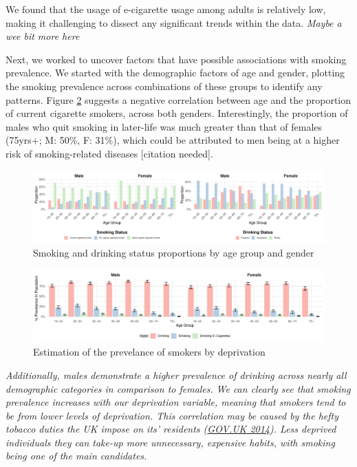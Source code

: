 \documentclass[
  11pt,
  twocolumn]{article}
\begin{document}
We found that the usage of e-cigarette usage among adults is relatively
low, making it challenging to dissect any significant trends within the
data. \emph{Maybe a wee bit more here}

Next, we worked to uncover factors that have possible associations with
smoking prevalence. We started with the demographic factors of age and
gender, plotting the smoking prevalence across combinations of these
groups to identify any patterns. Figure \ref{fig:output-prevelance-plot}
suggests a negative correlation between age and the proportion of
current cigarette smokers, across both genders. Interestingly, the
proportion of males who quit smoking in later-life was much greater than
that of females (75yrs+; M: 50\%, F: 31\%), which could be attributed to
men being at a higher risk of smoking-related diseases {[}citation
needed{]}.

\begin{figure}[H]
\includegraphics{Coursework_files/figure-latex/output-smoking-drinking-age-plot-1} \caption{Smoking and drinking status proportions by age group and gender}\label{fig:output-smoking-drinking-age-plot}
\end{figure}

\begin{figure}[H]
\includegraphics{Coursework_files/figure-latex/output-prevelance-plot-1} \caption{Estimation of the prevelance of smokers by deprivation}\label{fig:output-prevelance-plot}
\end{figure}

\emph{Additionally, males demonstrate a higher prevalence of drinking
across nearly all demographic categories in comparison to females.}
\emph{We can clearly see that smoking prevalence increases with our
deprivation variable, meaning that smokers tend to be from lower levels
of deprivation. This correlation may be caused by the hefty tobacco
duties the UK impose on its' residents
(\protect\hyperlink{ref-GovUK}{GOV.UK 2014}). Less deprived individuals
they can take-up more unnecessary, expensive habits, with smoking being
one of the main candidates.}
\end{document}
